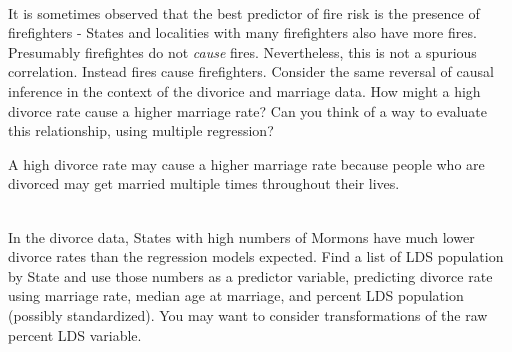 \documentclass[12pt]{article}\usepackage[]{graphicx}\usepackage[]{color}
\newenvironment{problem}[2][Problem]{\begin{trivlist}
\item[\hskip \labelsep {\bfseries #1}\hskip \labelsep {\bfseries #2.}]}{\end{trivlist}}
\begin{document}
\begin{problem}{5M3}
\text{ }\\
It is sometimes observed that the best predictor of fire risk is the presence of firefighters - States and localities with many firefighters also have more fires. Presumably firefightes do not \textit{cause} fires. Nevertheless, this is not a spurious correlation. Instead fires cause firefighters. Consider the same reversal of causal inference in the context of the divorice and marriage data. How might a high divorce rate cause a higher marriage rate? Can you think of a way to evaluate this relationship, using multiple regression?
\end{problem}

A high divorce rate may cause a higher marriage rate because people who are divorced may get married multiple times throughout their lives.

\begin{problem}{5M4}
\text{ }\\
In the divorce data, States with high numbers of Mormons have much lower divorce rates than the regression models expected. Find a list of LDS population by State and use those numbers as a predictor variable, predicting divorce rate using marriage rate, median age at marriage, and percent LDS population (possibly standardized). You may want to consider transformations of the raw percent LDS variable.
\end{problem}
\end{document}
